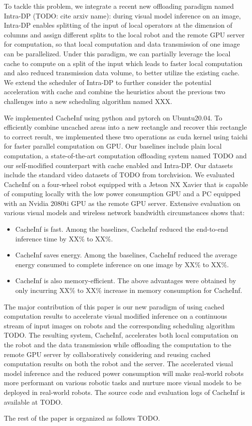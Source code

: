To tackle this problem, we integrate a recent new offloading paradigm named Intra-DP (TODO: cite arxiv name): during visual model inference on an image, Intra-DP enables splitting of the input of local operators at the dimension of columns and assign different splits to the local robot and the remote GPU server for computation, so that local computation and data transmission of one image can be parallelized.
Under this paradigm, we can partially leverage the local cache to compute on a split of the input which leads to faster local computation and also reduced transmission data volume, to better utilize the existing cache. 
We extend the scheduler of Intra-DP to further consider the potential acceleration with cache and combine the heuristics about the previous two challenges into a new scheduling algorithm named XXX.

We implemented CacheInf using python and pytorch on Ubuntu20.04. 
To efficiently combine uncached areas into a new rectangle and recover this rectangle to correct result, we implemented these two operations as cuda kernel using taichi for faster parallel computation on GPU.
Our baselines include plain local computation, a state-of-the-art computation offloading system named TODO and our self-modified counterpart with cache enabled and Intra-DP.
Our datasets include the standard video datasets of TODO from torchvision.
We evaluated CacheInf on a four-wheel robot equipped with a Jetson NX Xavier that is capable of computing locally with the low power consumption GPU and a PC equipped with an Nvidia 2080ti GPU as the remote GPU server.
Extensive evaluation on various visual models and wireless network bandwidth circumstances shows that:
\begin{itemize}
    \item CacheInf is fast. Among the baselines, CacheInf reduced the end-to-end inference time by XX\% to XX\%.
    \item CacheInf saves energy. Among the baselines, CacheInf reduced the average energy consumed to complete inference on one image by XX\% to XX\%.
    \item CacheInf is also memory-efficient. The above advantages were obtained by only incurring XX\% to XX\% increase in memory consumption for CacheInf.
\end{itemize}

The major contribution of this paper is our new paradigm of using cached computation results to accelerate visual modified inference on a continuous stream of input images on robots and the corresponding scheduling algorithm TODO.
The resulting system, CacheInf, accelerates both local computation on the robot and the data transmission while offloading the computation to the remote GPU server by collaboratively considering and reusing cached computation results on both the robot and the server.
The accelerated visual model inference and the reduced power consumption will make real-world robots more performant on various robotic tasks and nurture more visual models to be deployed in real-world robots.
The source code and evaluation logs of CacheInf is available at TODO.

The rest of the paper is organized as follows TODO.

